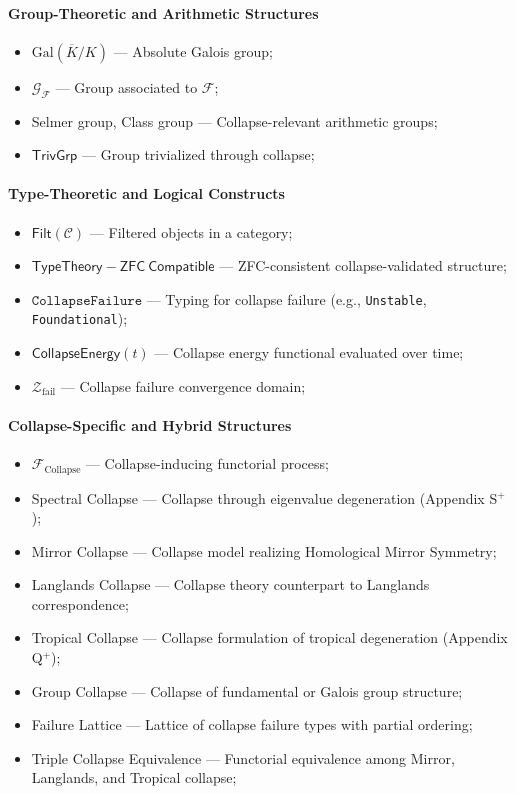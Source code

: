 \documentclass[11pt]{article}
\begin{document}
\paragraph{Group-Theoretic and Arithmetic Structures}
\begin{itemize}
    \item $\mathrm{Gal}(\overline{K}/K)$ — Absolute Galois group;
    \item $\mathcal{G}_{\mathcal{F}}$ — Group associated to $\mathcal{F}$;
    \item Selmer group, Class group — Collapse-relevant arithmetic groups;
    \item $\mathsf{TrivGrp}$ — Group trivialized through collapse;
\end{itemize}

\paragraph{Type-Theoretic and Logical Constructs}
\begin{itemize}
    \item $\mathsf{Filt}(\mathcal{C})$ — Filtered objects in a category;
    \item $\mathsf{TypeTheory{-}ZFC\ Compatible}$ — ZFC-consistent collapse-validated structure;
    \item $\texttt{CollapseFailure}$ — Typing for collapse failure (e.g., \texttt{Unstable}, \texttt{Foundational});
    \item $\mathsf{CollapseEnergy}(t)$ — Collapse energy functional evaluated over time;
    \item $\mathcal{Z}_{\mathrm{fail}}$ — Collapse failure convergence domain;
\end{itemize}

\paragraph{Collapse-Specific and Hybrid Structures}
\begin{itemize}
    \item $\mathcal{F}_{\mathrm{Collapse}}$ — Collapse-inducing functorial process;
    \item Spectral Collapse — Collapse through eigenvalue degeneration (Appendix S$^{+}$);
    \item Mirror Collapse — Collapse model realizing Homological Mirror Symmetry;
    \item Langlands Collapse — Collapse theory counterpart to Langlands correspondence;
    \item Tropical Collapse — Collapse formulation of tropical degeneration (Appendix Q$^{+}$);
    \item Group Collapse — Collapse of fundamental or Galois group structure;
    \item Failure Lattice — Lattice of collapse failure types with partial ordering;
    \item Triple Collapse Equivalence — Functorial equivalence among Mirror, Langlands, and Tropical collapse;
\end{itemize}
\end{document}
